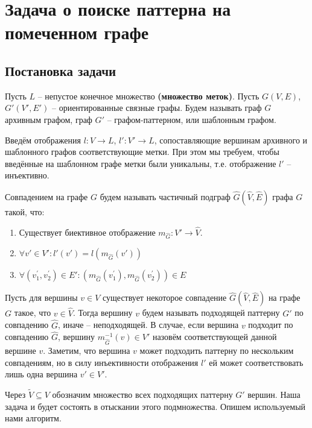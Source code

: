\section{Задача о поиске паттерна на помеченном графе}

\subsection{Постановка задачи}
\par Пусть $L$ -- непустое конечное множество \textbf{(множество меток)}. Пусть $G(V, E)$, $G'(V', E')$ -- ориентированные связные графы. Будем называть граф $G$ архивным графом, граф $G'$ -- графом-паттерном, или шаблонным графом.

Введём отображения $l : V \to L$, $l' : V' \to L$, сопоставляющие вершинам архивного и шаблонного графов соответствующие метки. При этом мы требуем, чтобы введённые на шаблонном графе метки были уникальны, т.е. отображение $l'$ -- инъективно.

\begin{defn}
	Совпадением на графе $G$ будем называть частичный подграф $\widehat{G}(\widehat{V}, \widehat{E})$ графа $G$ такой, что:
	\begin{enumerate}
		\item Существует биективное отображение $m_{\widehat{G}}: V' \to \widehat{V}$.
		\item $\forall v' \in V': l'(v') = l(m_{\widehat{G}}(v'))$
		\item $\forall (v^{\prime}_1, v^{\prime}_2) \in E': (m_{\widehat{G}}(v^{\prime}_1), m_{\widehat{G}}(v^{\prime}_2)) \in E$
	\end{enumerate}
\end{defn} 

Пусть для вершины $v \in V$ существует некоторое совпадение  $\widehat{G}(\widehat{V}, \widehat{E})$ на графе $G$ такое, что $v \in \widehat{V}$. Тогда вершину $v$ будем называть подходящей паттерну $G'$ по совпадению $\widehat{G}$, иначе -- неподходящей. В случае, если вершина $v$ подходит по совпадению $\widehat{G}$, вершину $m_{\widehat{G}}^{-1}(v) \in  V'$ назовём соответствующей данной вершине $v$. Заметим, что вершина $v$ может подходить паттерну по нескольким совпадениям, но в силу инъективности отображения $l'$ ей может соответствовать лишь одна вершина $v' \in  V'$.

Через $\widetilde{V} \subseteq V$ обозначим множество всех подходящих паттерну $G'$ вершин. Наша задача и будет состоять в отыскании этого подмножества. Опишем используемый нами алгоритм.

